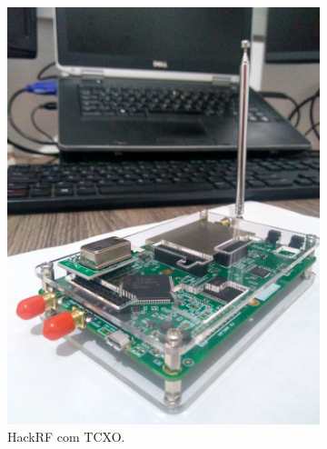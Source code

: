 \documentclass[
  12pt,				%
  openright,			%
  twoside,			%
  a4paper,			%
  english,			%
  french,				%
  spanish,			%
  brazil,				%
  ]{abntex2}
\begin{document}
\begin{figure}[!htb]
\begin{subfigure}[b]{0.45\linewidth}
    \includegraphics[width=\linewidth]{figures/hackrf/hack_rf.jpg}
    \caption{HackRF com TCXO.}
    \label{fig:hack_rf}
  \end{subfigure}
  \hspace{0.5cm}
  \begin{subfigure}[b]{0.45\linewidth}
    \centering

\end{subfigure}
\end{figure}
\end{document}
